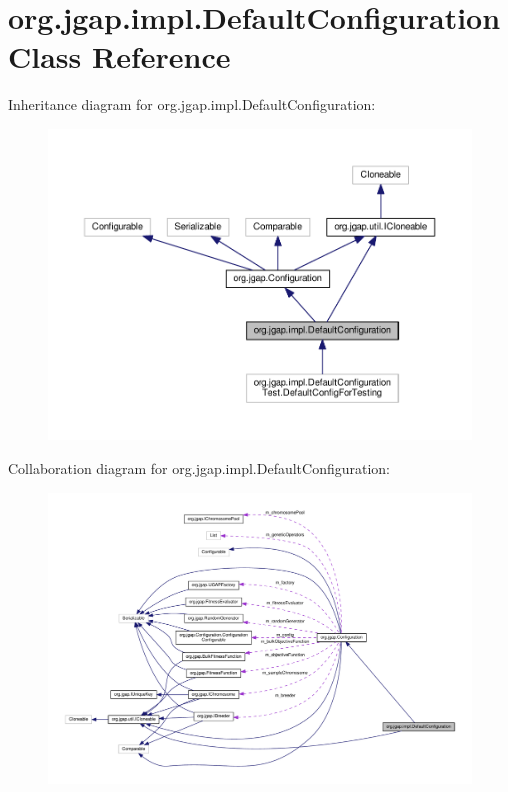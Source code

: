 \hypertarget{classorg_1_1jgap_1_1impl_1_1_default_configuration}{\section{org.\-jgap.\-impl.\-Default\-Configuration Class Reference}
\label{classorg_1_1jgap_1_1impl_1_1_default_configuration}
}


Inheritance diagram for org.\-jgap.\-impl.\-Default\-Configuration\-:
\nopagebreak
\begin{figure}[H]
\begin{center}
\leavevmode
\includegraphics[width=350pt]{classorg_1_1jgap_1_1impl_1_1_default_configuration__inherit__graph}
\end{center}
\end{figure}


Collaboration diagram for org.\-jgap.\-impl.\-Default\-Configuration\-:
\nopagebreak
\begin{figure}[H]
\begin{center}
\leavevmode
\includegraphics[width=350pt]{classorg_1_1jgap_1_1impl_1_1_default_configuration__coll__graph}
\end{center}
\end{figure}
